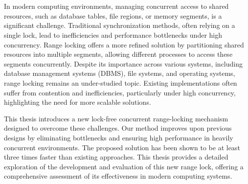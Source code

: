 \chapter{\abstractname}

In modern computing environments, managing concurrent access to shared resources, such as database tables, file regions, or memory segments, is a significant challenge. 
Traditional synchronization methods, often relying on a single lock, lead to inefficiencies and performance bottlenecks under high concurrency. 
Range locking offers a more refined solution by partitioning shared resources into multiple segments, allowing different processes to access these segments concurrently. 
Despite its importance across various systems, including database management systems (DBMS), file systems, and operating systems, range locking remains an under-studied topic. 
Existing implementations often suffer from contention and inefficiencies, particularly under high concurrency, highlighting the need for more scalable solutions.

This thesis introduces a new lock-free concurrent range-locking mechanism designed to overcome these challenges.
Our method improves upon previous designs by eliminating bottlenecks and ensuring high performance in heavily concurrent environments.
The proposed solution has been shown to be at least three times faster than existing approaches. 
This thesis provides a detailed exploration of the development and evaluation of this new range lock, offering a comprehensive assessment of its effectiveness in modern computing systems.
